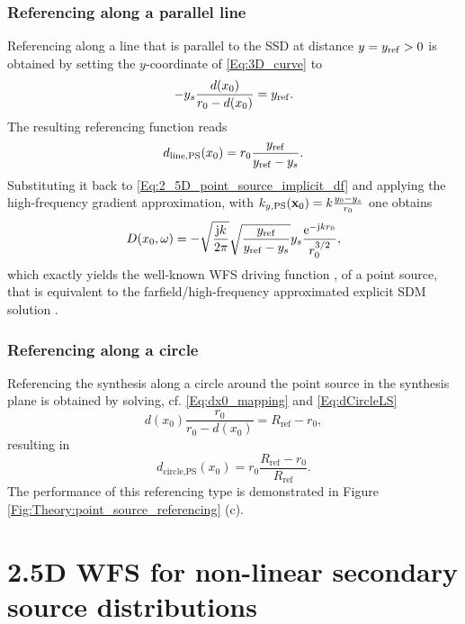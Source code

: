 \subsubsection{Referencing along a parallel line}
Referencing along a line that is parallel to the SSD at distance $y=y_{\mathrm{ref}}>0$ is obtained by setting the $y$-coordinate of \eqref{Eq:3D_curve} to
\begin{equation}
-y_s \frac{d(x_0)}{r_0 - d(x_0)} = y_{\mathrm{ref}}.
\end{equation}
The resulting referencing function reads
\begin{equation}
d_\text{line,PS}(x_0) = r_0 \frac{y_{\mathrm{ref}}}{y_{\mathrm{ref}}-y_s}.
\end{equation}
Substituting it back to \eqref{Eq:2_5D_point_source_implicit_df} and applying the high-frequency gradient approximation, with $k_{y,\text{PS}}(\mathbf{x}_0) = k \frac{y_0-y_s}{r_0} $ one obtains
\begin{equation}
D(x_0,\omega) = 
- \sqrt{\frac{\mathrm{j} k}{2\pi}} \sqrt{\frac{y_{\mathrm{ref}}}{y_{\mathrm{ref}} -y_s}}  y_s \frac{\mathrm{e}^{-\mathrm{j} k r_0 }}{r_0^{3/2}},
\end{equation}
which exactly yields the well-known WFS driving function \cite[(2.27)]{Verheijen1997}, \cite[(3.16)\&(3.17)]{Start1997:phd} of a point source, that is equivalent to the farfield/high-frequency approximated explicit SDM solution \cite[(25)]{Spors10ahrens:analysis}.

\subsubsection{Referencing along a circle}
Referencing the synthesis along a circle around the point source in the synthesis plane is obtained by solving, cf. \eqref{Eq:dx0_mapping} and \eqref{Eq:dCircleLS}
\begin{equation}
d(x_0)\frac{r_0}{r_0 - d(x_0)} = R_{\mathrm{ref}} - r_0,
\end{equation}
resulting in
\begin{equation}
d_\text{circle,PS}(x_0)  = r_0 \frac{R_{\mathrm{ref}} - r_0}{R_{\mathrm{ref}}}.
\end{equation}
%
The performance of this referencing type is demonstrated in Figure \ref{Fig:Theory:point_source_referencing} (c).

\section{2.5D WFS for non-linear secondary source distributions}

